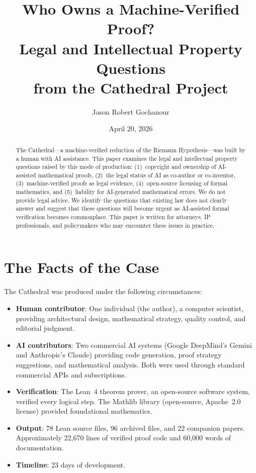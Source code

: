 \documentclass[11pt,a4paper]{article}
\title{%
  Who Owns a Machine-Verified Proof?\\
  Legal and Intellectual Property Questions\\
  from the Cathedral Project%
}
\author{
  Jason Robert Gochanour
}
\date{April 20, 2026}
\begin{document}
\maketitle

\begin{abstract}
The Cathedral---a machine-verified reduction of the Riemann
Hypothesis---was built by a human with AI assistance. This paper
examines the legal and intellectual property questions raised by
this mode of production: (1)~copyright and ownership of
AI-assisted mathematical proofs, (2)~the legal status of AI as
co-author or co-inventor, (3)~machine-verified proofs as legal
evidence, (4)~open-source licensing of formal mathematics, and
(5)~liability for AI-generated mathematical errors. We do not
provide legal advice. We identify the questions that existing law
does not clearly answer and suggest that these questions will
become urgent as AI-assisted formal verification becomes
commonplace. This paper is written for attorneys, IP professionals,
and policymakers who may encounter these issues in practice.
\end{abstract}

\tableofcontents

\section{The Facts of the Case}

The Cathedral was produced under the following circumstances:

\begin{itemize}
  \item \textbf{Human contributor}: One individual (the author),
    a computer scientist, providing architectural design,
    mathematical strategy, quality control, and editorial judgment.

  \item \textbf{AI contributors}: Two commercial AI systems
    (Google DeepMind's Gemini and Anthropic's Claude) providing
    code generation, proof strategy suggestions, and mathematical
    analysis. Both were used through standard commercial APIs and
    subscriptions.

  \item \textbf{Verification}: The Lean~4 theorem prover, an
    open-source software system, verified every logical step.
    The Mathlib library (open-source, Apache~2.0 license) provided
    foundational mathematics.

  \item \textbf{Output}: 78 Lean source files, 96 archived files,
    and 22 companion papers. Approximately 22,670 lines of
    verified proof code and 60,000 words of documentation.

  \item \textbf{Timeline}: 23 days of development.
\end{itemize}
\end{document}
